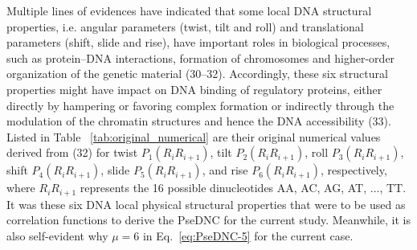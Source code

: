 Multiple lines of evidences have indicated that some local DNA structural properties, i.e. angular parameters (twist, tilt and roll) and translational parameters (shift, slide and rise), have important roles in biological processes, such as protein–DNA interactions, formation of chromosomes and higher-order organization of the genetic material (30–32). Accordingly, these six structural properties might have impact on DNA binding of regulatory proteins, either directly by hampering or favoring complex formation or indirectly through the modulation of the chromatin structures and hence the DNA accessibility (33). Listed in Table
~\ref{tab:original_numerical} are their original numerical values derived from (32) for twist $P_{1}(R_{i}R_{i+1})$⁠, tilt $P_{2}(R_{i}R_{i+1})$⁠, roll $P_{3}(R_{i}R_{i+1})$⁠, shift $P_{4}(R_{i}R_{i+1})$⁠, slide $P_{5}(R_{i}R_{i+1})$⁠, and rise $P_{6}(R_{i}R_{i+1})$⁠, respectively, where $R_{i}R_{i+1}$ represents the 16 possible dinucleotides AA, AC, AG, AT, ..., TT. It was these six DNA local physical structural properties that were to be used as correlation functions to derive the \gls{PseDNC} for the current study. Meanwhile, it is also self-evident why $\mu=6$ in Eq.~\ref{eq:PseDNC-5} for the current case.


